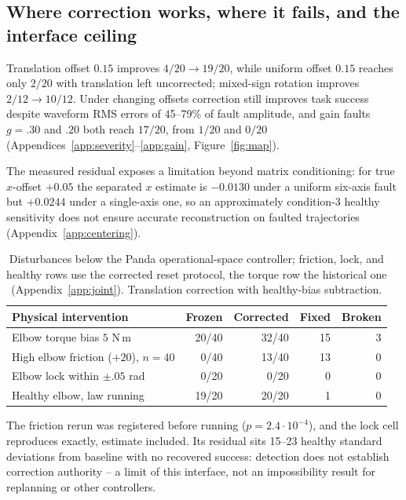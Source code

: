 \subsection{Where correction works, where it fails, and the interface ceiling}

Translation offset $0.15$ improves $4/20\to19/20$, while uniform offset
$0.15$ reaches only $2/20$ with translation left uncorrected; mixed-sign
rotation improves $2/12\to10/12$. Under changing offsets correction still
improves task success despite waveform RMS errors of 45--79\% of fault
amplitude, and gain faults $g=.30$ and $.20$ both reach $17/20$, from $1/20$
and $0/20$ (Appendices~\ref{app:severity}--\ref{app:gain},
Figure~\ref{fig:map}).

The measured residual exposes a limitation beyond matrix conditioning: for
true $x$-offset $+0.05$ the separated $x$ estimate is $-0.0130$ under a
uniform six-axis fault but $+0.0244$ under a single-axis one, so an
approximately condition-$3$ healthy sensitivity does not ensure accurate
reconstruction on faulted trajectories (Appendix~\ref{app:centering}).

\begin{table}[H]
\centering\small
\caption{Disturbances below the Panda operational-space controller;
friction, lock, and healthy rows use the corrected reset protocol, the
torque row the historical one (Appendix~\ref{app:joint}). Translation
correction with healthy-bias subtraction.}
\label{tab:physical}
\begin{tabular}{lrrrr}
\toprule
Physical intervention & Frozen & Corrected & Fixed & Broken\\
\midrule
Elbow torque bias $5$ N\,m & 20/40 & 32/40 & 15 & 3\\
High elbow friction ($+20$), $n{=}40$ & 0/40 & 13/40 & 13 & 0\\
Elbow lock within $\pm.05$ rad & 0/20 & 0/20 & 0 & 0\\
Healthy elbow, law running & 19/20 & 20/20 & 1 & 0\\
\bottomrule
\end{tabular}
\end{table}
The friction rerun was registered before running ($p=2.4\cdot10^{-4}$), and
the lock cell reproduces exactly, estimate included. Its residual sits
15--23 healthy standard deviations from baseline with no recovered success:
detection does not establish correction authority -- a limit of this
interface, not an impossibility result for replanning or other controllers.

